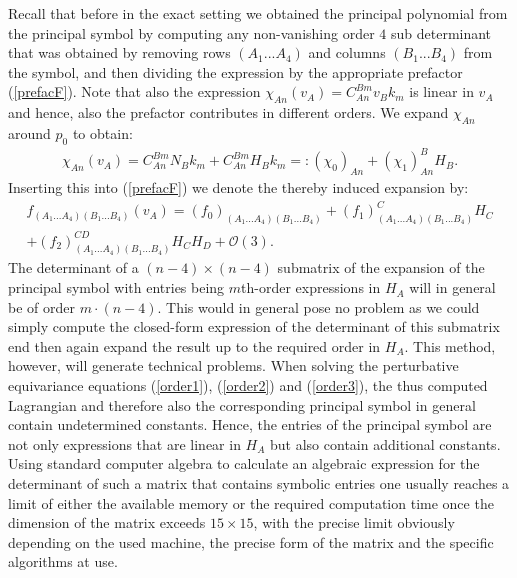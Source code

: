 Recall that before in the exact setting we obtained the principal polynomial from the principal symbol by computing any non-vanishing order $4$ sub determinant that was obtained by removing rows $(A_1...A_4)$ and columns $(B_1...B_4)$ from the symbol, and then dividing the expression by the appropriate prefactor (\ref{prefacF}).
Note that also the expression $\chi_{An}(v_A) = C_{An}^{Bm}v_Bk_m$ is linear in $v_A$ and hence, also the prefactor contributes in different orders. We expand $\chi_{An}$ around $p_0$ to obtain:
\begin{align}
\chi_{An}(v_A) =  C^{Bm}_{An} N_B k_m + C^{Bm}_{An} H_B k_m =: (\chi_0)_{An} + (\chi_1)^B_{An}H_B.
\end{align}
Inserting this into (\ref{prefacF}) we denote the thereby induced expansion by:
\begin{multline}\label{prefacExp}
    f_{(A_1...A_4)(B_1...B_4)}(v_A) = (f_0)_{(A_1...A_4)(B_1...B_4)} + (f_1)^C_{(A_1...A_4)(B_1...B_4)}H_C\\ + (f_2)^{CD}_{(A_1...A_4)(B_1...B_4)}H_CH_D
    + \mathcal{O}(3).
\end{multline}
The determinant of a $(n-4) \times (n-4)$ submatrix of the expansion of the principal symbol with entries being $m$th-order expressions in $H_A$ will in general be of order $m\cdot(n-4)$. This would in general pose no problem as we could simply compute the closed-form expression of the determinant of this submatrix end then again expand the result up to the required order in $H_A$. This method, however, will generate technical problems. When solving the perturbative equivariance equations (\ref{order1}), (\ref{order2}) and (\ref{order3}), the thus computed Lagrangian and therefore also the corresponding principal symbol in general contain undetermined constants. Hence, the entries of the principal symbol are not only expressions that are linear in $H_A$ but also contain additional constants. Using standard computer algebra to calculate an algebraic expression for the determinant of such a matrix that contains symbolic entries one usually reaches a limit of either the available memory or the required computation time once the dimension of the matrix exceeds $15 \times 15$, with the precise limit obviously depending on the used machine, the precise form of the matrix and the specific algorithms at use. 

